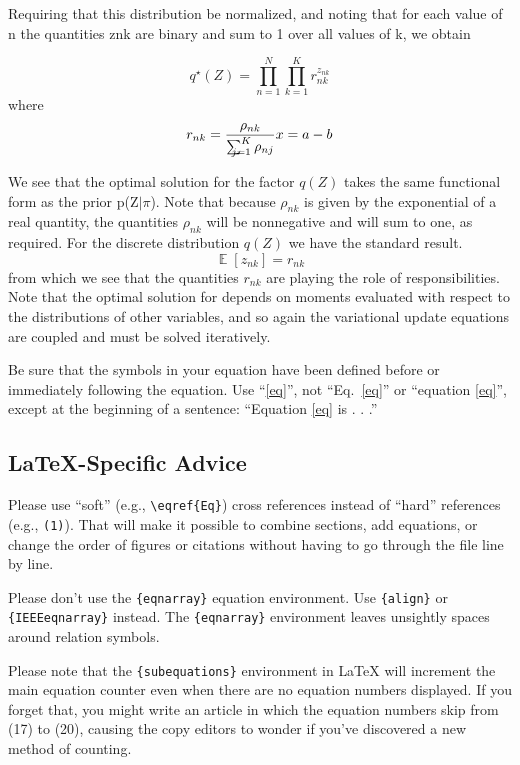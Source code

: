 \documentclass[conference]{IEEEtran}
\begin{document}
Requiring that this distribution be normalized, and noting that for each value of n the quantities znk are binary and sum to 1 over all values of k, we obtain

\begin{equation}
    q^\star(Z) = \prod_{n=1}^{N}\prod_{k=1}^{K} r_{nk}^{z_{nk}}
\end{equation}
where
\begin{equation}
    r_{nk} = \frac{\rho_{nk}}{\sum_{\mathclap{j=1}}^{K}\rho_{nj}}
    x = a-b
\end{equation}

We see that the optimal solution for the factor $q(Z)$ takes the same functional form
as the prior p(Z$|\pi$). Note that because $\rho_{nk}$ is given by the exponential of a real
quantity, the quantities $\rho_{nk}$ will be nonnegative and will sum to one, as required.
For the discrete distribution $q(Z)$ we have the standard result.
\begin{equation}
    \mathop{\mathbb{E}}[z_{nk}] = r_{nk}
\end{equation}
from which we see that the quantities $r_{nk}$ are playing the role of responsibilities.
Note that the optimal solution for depends on moments evaluated with respect
to the distributions of other variables, and so again the variational update equations
are coupled and must be solved iteratively.

Be sure that the 
symbols in your equation have been defined before or immediately following 
the equation. Use ``\eqref{eq}'', not ``Eq.~\eqref{eq}'' or ``equation \eqref{eq}'', except at 
the beginning of a sentence: ``Equation \eqref{eq} is . . .''

\subsection{\LaTeX-Specific Advice}

Please use ``soft'' (e.g., \verb|\eqref{Eq}|) cross references instead
of ``hard'' references (e.g., \verb|(1)|). That will make it possible
to combine sections, add equations, or change the order of figures or
citations without having to go through the file line by line.

Please don't use the \verb|{eqnarray}| equation environment. Use
\verb|{align}| or \verb|{IEEEeqnarray}| instead. The \verb|{eqnarray}|
environment leaves unsightly spaces around relation symbols.

Please note that the \verb|{subequations}| environment in {\LaTeX}
will increment the main equation counter even when there are no
equation numbers displayed. If you forget that, you might write an
article in which the equation numbers skip from (17) to (20), causing
the copy editors to wonder if you've discovered a new method of
counting.
\end{document}
